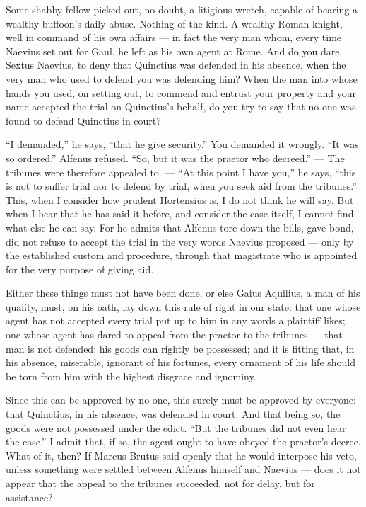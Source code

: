  Some shabby fellow picked out, no doubt, a litigious wretch, capable of bearing a wealthy buffoon's daily abuse. Nothing of the kind. A wealthy Roman knight, well in command of his own affairs --- in fact the very man whom, every time Naevius set out for Gaul, he left as his own agent at Rome. And do you dare, Sextus Naevius, to deny that Quinctius was defended in his absence, when the very man who used to defend you was defending him? When the man into whose hands you used, on setting out, to commend and entrust your property and your name accepted the trial on Quinctius's behalf, do you try to say that no one was found to defend Quinctius in court?

 ``I demanded,'' he says, ``that he give security.'' You demanded it wrongly. ``It was so ordered.'' Alfenus refused. ``So, but it was the praetor who decreed.'' --- The tribunes were therefore appealed to. --- ``At this point I have you,'' he says, ``this is not to suffer trial nor to defend by trial, when you seek aid from the tribunes.'' This, when I consider how prudent Hortensius is, I do not think he will say. But when I hear that he has said it before, and consider the case itself, I cannot find what else he can say. For he admits that Alfenus tore down the bills, gave bond, did not refuse to accept the trial in the very words Naevius proposed --- only by the established custom and procedure, through that magistrate who is appointed for the very purpose of giving aid.

 Either these things must not have been done, or else Gaius Aquilius, a man of his quality, must, on his oath, lay down this rule of right in our state: that one whose agent has not accepted every trial put up to him in any words a plaintiff likes; one whose agent has dared to appeal from the praetor to the tribunes --- that man is not defended; his goods can rightly be possessed; and it is fitting that, in his absence, miserable, ignorant of his fortunes, every ornament of his life should be torn from him with the highest disgrace and ignominy.

 Since this can be approved by no one, this surely must be approved by everyone: that Quinctius, in his absence, was defended in court. And that being so, the goods were not possessed under the edict. ``But the tribunes did not even hear the case.'' I admit that, if so, the agent ought to have obeyed the praetor's decree. What of it, then? If Marcus Brutus said openly that he would interpose his veto, unless something were settled between Alfenus himself and Naevius --- does it not appear that the appeal to the tribunes succeeded, not for delay, but for assistance?

